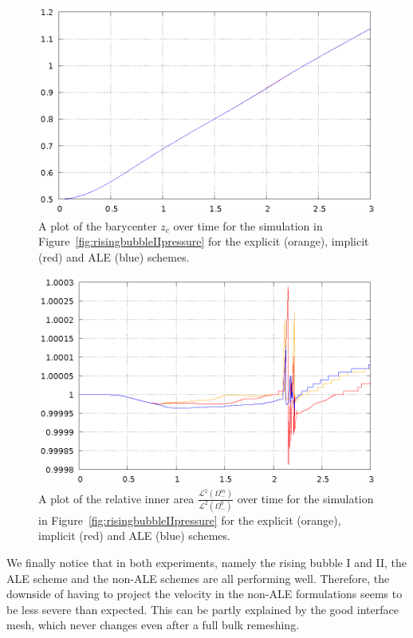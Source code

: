 \begin{figure}[htbp]
\centering
\includegraphics[width=.45\textwidth]
{figures/navier_stokes/rising_bubble_II_barycenter.ps}
\caption[Navier--Stokes rising bubble II barycenter]
{A plot of the barycenter $z_c$ over time for the simulation in
Figure~\ref{fig:risingbubbleIIpressure} for the explicit (orange), implicit
(red) and ALE (blue) schemes.}
\label{fig:risingbubbleIIbarycenter}
\end{figure}

\begin{figure}[htbp]
\centering
\includegraphics[width=.45\textwidth]
{figures/navier_stokes/rising_bubble_II_inner_volume.ps}
\caption[Navier--Stokes rising bubble II inner area]
{A plot of the relative inner area
$\frac{\mathcal{L}^2(\Omega^m_-)}{\mathcal{L}^2(\Omega^0_-)}$ over time for the
simulation in Figure~\ref{fig:risingbubbleIIpressure} for the explicit
(orange), implicit (red) and ALE (blue) schemes.}
\label{fig:risingbubbleIIinnervolume}
\end{figure}

We finally notice that in both experiments, namely the rising bubble I and II,
the ALE scheme and the non-ALE schemes are all performing well. Therefore, the
downside of having to project the velocity in the non-ALE formulations seems to
be less severe than expected. This can be partly explained by the good
interface mesh, which never changes even after a full bulk remeshing.

